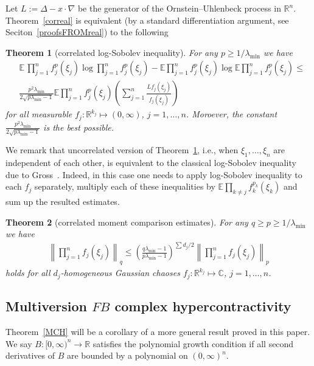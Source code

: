 \documentclass[9pt, a4paper]{amsart}
\newcommand{\1}{{\chi_{}}}%
\newtheorem{theorem}{Theorem}
\numberwithin{equation}{section}
\begin{document}
Let $L:=\Delta -x\cdot \nabla$ be the generator of the Ornstein--Uhlenbeck process in $\mathbb{R}^{n}$. Theorem~\ref{correal} is equivalent (by a standard differentiation argument, see Seciton~\ref{proofsFROMreal}) to the following 
\begin{theorem}[correlated log-Sobolev inequality]\label{corlogsob}
 For any $ p \geq 1/\lambda_{\min}$ we have 
\begin{align}\label{nfunlog}
  &\mathbb{E}\,  \prod_{j=1}^{n}f^{p}_{j}(\xi_{j})\log \prod_{j=1}^{n}f^{p}_{j}(\xi_{j}) - \mathbb{E} \prod_{j=1}^{n}f^{p}_{j}(\xi_{j}) \log \mathbb{E} \prod_{j=1}^{n}f^{p}_{j}(\xi_{j}) \leq\\
  &\frac{p^{2}\lambda_{\min}}{2\sqrt{p\lambda_{\min}-1}} \mathbb{E}\prod_{j=1}^{n}f^{p}_{j}(\xi_{j}) \left(\sum_{j=1}^{n} \frac{Lf_{j}(\xi_{j})}{f_{j}(\xi_{j})}\right) \nonumber
\end{align}
for all measurable $f_{j} :\mathbb{R}^{k_{j}} \mapsto (0, \infty)$, $j=1, \ldots, n$.  Moroever, the constant $\frac{p^{2}\lambda_{\min}}{2\sqrt{p\lambda_{\min}-1}}$ is the best possible.
\end{theorem}

We remark that uncorrelated version of Theorem~\ref{corlogsob}, i.e., when $\xi_{1}, \ldots, \xi_{n}$ are independent of each other, is equivalent to the classical log-Sobolev inequality due to Gross~\cite{Gross}. 
Indeed, in this case one needs to apply log-Sobolev inequality to each $f_{j}$ separately, multiply each of these inequalities by $\mathbb{E}\prod_{k \neq j} f_{k}^{p_{k}}(\xi_{k})$ and sum up the resulted estimates.  

\begin{theorem}[correlated moment comparison estimates]\label{chaoses2}
  For any $q\geq p \geq 1/\lambda_{\min}$ we have 
  \begin{align*}
      \left\|\prod_{j=1}^{n}f_{j}(\xi_{j})\right\|_{q}\leq \left(\frac{q\lambda_{\min}-1}{p\lambda_{\min}-1}\right)^{\sum d_{j}/2}\left\|\prod_{j=1}^{n}f_{j}(\xi_{j})\right\|_{p}
  \end{align*}
  holds for all $d_{j}$-homogeneous Gaussian chaoses $f_{j} :\mathbb{R}^{k_{j}}\mapsto \mathbb{C}$, $j=1, \ldots, n$.
\end{theorem}

\vskip1cm

 



\subsection{Multiversion $FB$ complex hypercontractivity}
Theorem~\ref{MCH} will be a corollary of a more general result proved in this paper. We say $B: [0, \infty)^{n} \to \mathbb{R}$ satisfies the polynomial growth condition if all second derivatives of $B$ are bounded by a polynomial on $(0, \infty)^{n}$. 
\end{document}
